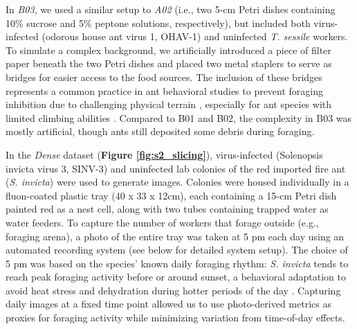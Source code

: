 In \textit{B03}, we used a similar setup to \textit{A02} (i.e., two 5-cm Petri dishes containing 10\% sucrose and 5\% peptone solutions, respectively), but included both virus-infected (odorous house ant virus 1, OHAV-1) and uninfected \emph{T. sessile} workers. To simulate a complex background, we artificially introduced a piece of filter paper beneath the two Petri dishes and placed two metal staplers to serve as bridges for easier access to the food sources. The inclusion of these bridges represents a common practice in ant behavioral studies to prevent foraging inhibition due to challenging physical terrain \cite{czaczkes_ant_2013}, especially for ant species with limited climbing abilities \cite{billen_pretarsus_2017}. Compared to B01 and B02, the complexity in B03 was mostly artificial, though ants still deposited some debris during foraging.

In the \textit{Dense} dataset (\textbf{Figure \ref{fig:s2_slicing}}), virus-infected (Solenopsis invicta virus 3, SINV-3) and uninfected lab colonies of the red imported fire ant (\emph{S. invicta}) were used to generate images. Colonies were housed individually in a fluon-coated plastic tray (40 x 33 x 12cm), each containing a 15-cm Petri dish painted red as a nest cell, along with two tubes containing trapped water as water feeders. To capture the number of workers that forage outside (e.g., foraging arena), a photo of the entire tray was taken at 5 pm each day using an automated recording system (see below for detailed system setup). The choice of 5 pm was based on the species' known daily foraging rhythm: \emph{S. invicta} tends to reach peak foraging activity before or around sunset, a behavioral adaptation to avoid heat stress and dehydration during hotter periods of the day \cite{lei_rhythms_2019, das_biological_2023}. Capturing daily images at a fixed time point allowed us to use photo-derived metrics as proxies for foraging activity while minimizing variation from time-of-day effects.

